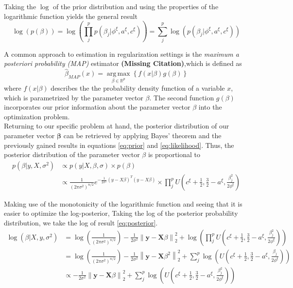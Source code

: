 \documentclass[12pt,a4paper]{article}
\newcommand{\norm}[1]{\left\lVert#1\right\rVert}
\DeclareMathOperator*{\argmax}{arg\,max}
\newcommand{\MC}{\textbf{(Missing Citation)}} %
\begin{document}
Taking the $\log$ of the prior distribution and using the properties of the logarithmic function yields the general result
\[
\log(p(\beta))=\log(\prod_j^p p(\beta_j|\phi^\xi, a^\xi, c^\xi))=\sum_j^p \log(p(\beta_j|\phi^\xi, a^\xi, c^\xi))
\]

A common approach to estimation in regularization settings is the \textit{maximum a posteriori probability (MAP)} estimator \MC ,which is defined as
\[
\hat{\beta}_{MAP}(x) = \underset{\beta \in \mathbb{R}^p}{\argmax}\left\{f(x|\beta)g(\beta)\right\}
\]
where $f(x|\beta)$ describes the the probability density function of a variable $x$, which is parametrized by the parameter vector $\beta$. The second function $g(\beta)$ incorporates our prior information about the parameter vector $\beta$ into the optimization problem.\\  

Returning to our specific problem at hand, the posterior distribution of our parameter vector $\mathbf{\beta}$ can be retrieved by applying Bayes' theorem and the previously gained results in equations \ref{eq:prior} and \ref{eq:likelihood}. Thus, the posterior distribution of the parameter vector $\beta$ is proportional to
\begin{align}
p(\beta|y, X, \sigma^2) 	&\propto p(y|X,\beta,\sigma)\times p(\beta) \nonumber\\
						&\propto \frac{1}{(2\pi\sigma^2)^{n/2}}e^{-\frac{1}{2\sigma^2}(y-X\beta)^T(y-X\beta)} \times \prod_j^p U\left(c^\xi + \frac{1}{2}, \frac{3}{2}-a^\xi, \frac{\beta_j^2}{2\phi^\xi}\right)\label{eq:posterior}
\end{align} 

Making use of the monotonicity of the logarithmic function and seeing that it is easier to optimize the log-posterior, Taking the log of the posterior probability distribution, we take the log of result \ref{eq:posterior}. 
\begin{align}
\log(\beta| X, y, \sigma^2) 	&= \log\left(\frac{1}{(2\pi\sigma^2)^{n/2}}\right) - \frac{1}{2\sigma^2}\norm{\mathbf{y} - \mathbf{X}\beta}_2^2 + \log\left(\prod_j^p U\left(c^\xi + \frac{1}{2}, \frac{3}{2}-a^\xi, \frac{\beta_j^2}{2\phi^\xi}\right)\right)\nonumber\\
							&= \log\left(\frac{1}{(2\pi\sigma^2)^{n/2}}\right) - \frac{1}{2\sigma^2}\norm{\mathbf{y} - \mathbf{X}\beta^2}_2^2 + \sum_j^p \log\left(U\left(c^\xi + \frac{1}{2}, \frac{3}{2}-a^\xi, \frac{\beta_j}{2\phi^\xi}\right)\right)\nonumber\\
							&\propto -\frac{1}{2\sigma^2}\norm{\mathbf{y} - \mathbf{X}\beta}_2^2 + \sum_j^p \log\left(U\left(c^\xi + \frac{1}{2}, \frac{3}{2}-a^\xi, \frac{\beta_j^2}{2\phi^\xi}\right)\right)\nonumber\\
\end{align}
\end{document}
